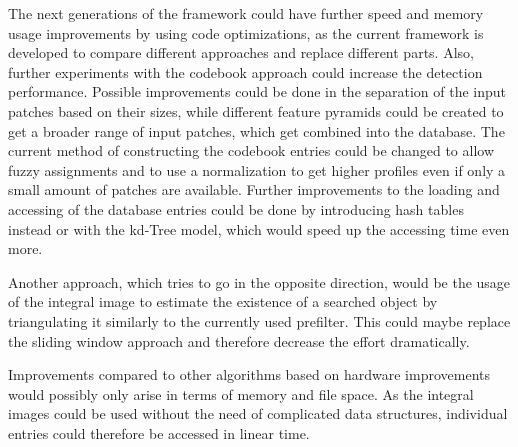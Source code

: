 The next generations of the framework could have further speed and memory usage improvements by using code optimizations, as the current framework is developed to compare different approaches and replace different parts. Also, further experiments with the codebook approach could increase the detection performance. Possible improvements could be done in the separation of the input patches based on their sizes, while different feature pyramids could be created to get a broader range of input patches, which get combined into the database. The current method of constructing the codebook entries could be changed to allow fuzzy assignments and to use a normalization to get higher profiles even if only a small amount of patches are available. Further improvements to the loading and accessing of the database entries could be done by introducing hash tables instead or with the kd-Tree model, which would speed up the accessing time even more.

Another approach, which tries to go in the opposite direction, would be the usage of the integral image to estimate the existence of a searched object by triangulating it similarly to the currently used prefilter. This could maybe replace the sliding window approach and therefore decrease the effort dramatically.

Improvements compared to other algorithms based on hardware improvements would possibly only arise in terms of memory and file space. As the integral images could be used without the need of complicated data structures, individual entries could therefore be accessed in linear time.
